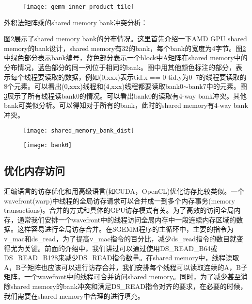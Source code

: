 \begin{figure}[htbp]
	\centering
	\texttt{[image: gemm\_inner\_product\_tile]}
	\label{fig:gemm_inner_product_tile}
\end{figure}

外积法矩阵乘的shared memory bank冲突分析：

图\ref{fig:shared_memory_bank_dist}展示了shared memory bank的分布情况。这里首先介绍一下AMD GPU shared memory的bank设计，shared memory有32的bank，每个bank的宽度为4字节。图\ref{fig:shared_memory_bank_dist}中绿色部分表示bank编号，蓝色部分表示一个block中A矩阵在shared memory中的分布情况，蓝色部分的同一列位于相同的bank。图中用其他颜色标注的部分，表示每个线程要读取的数据，例如(0,xxx)表示tid.x == 0 tid.y为0~7的线程要读取的8个元素。可以看出(0,xxx)线程和(4,xxx)线程都要读取bank0$\sim$bank7中的元素。图\ref{fig:bank0}展示了所有线程读bank0的情况。可以看出bank0的读取有4-way bank冲突。其他bank可类似分析。可以得知对于所有的bank，此时的shared memory有4-way bank冲突。



\begin{figure}[htbp]
	\centering
	\texttt{[image: shared\_memory\_bank\_dist]}
	\label{fig:shared_memory_bank_dist}
\end{figure}

\begin{figure}[htbp]
	\centering
	\texttt{[image: bank0]}
	\label{fig:bank0}
\end{figure}

\subsection{优化内存访问}
汇编语言的访存优化和用高级语言(如CUDA，OpenCL)优化访存比较类似。一个wavefront(warp)中线程的全局访存请求可以合并成一到多个内存事务(memory transactions)。合并的方式和具体的GPU访存模式有关。为了高效的访问全局内存，通常我们安排一个wavefront中的线程访问全局内存中一段连续内存区域的数据。这样容易进行全局访存合并。在SGEMM程序的主循环中，主要的指令为v\_mac和ds\_read，为了提高v\_mac指令的百分比，减少ds\_read指令的数目就变得尤为关键。前面的介绍中，我们讲过可以通过使用DS\_READ\_B64或DS\_READ\_B128来减少DS\_READ指令数量。在shared memory中，线程读取A，B子矩阵也应该可以进行访存合并，我们安排每个线程可以读取连续的A，B子矩阵，一个wavefront中的线程可合并访问shared memory。同时，为了减少甚至消除shared memory的bank冲突和满足DS\_READ指令对齐的要求，在必要的时候，我们需要在shared memory中合理的进行填充。


